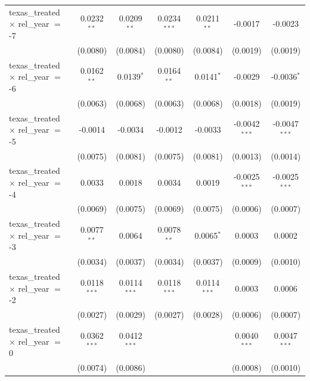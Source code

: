 \begin{tabular}{lcccccc}
   texas\_treated $\times$ rel\_year $=$ -7     & 0.0232$^{**}$  & 0.0209$^{**}$  & 0.0234$^{***}$ & 0.0211$^{**}$  & -0.0017         & -0.0023\\   
                                                & (0.0080)       & (0.0084)       & (0.0080)       & (0.0084)       & (0.0019)        & (0.0019)\\   
   texas\_treated $\times$ rel\_year $=$ -6     & 0.0162$^{**}$  & 0.0139$^{*}$   & 0.0164$^{**}$  & 0.0141$^{*}$   & -0.0029         & -0.0036$^{*}$\\   
                                                & (0.0063)       & (0.0068)       & (0.0063)       & (0.0068)       & (0.0018)        & (0.0019)\\   
   texas\_treated $\times$ rel\_year $=$ -5     & -0.0014        & -0.0034        & -0.0012        & -0.0033        & -0.0042$^{***}$ & -0.0047$^{***}$\\   
                                                & (0.0075)       & (0.0081)       & (0.0075)       & (0.0081)       & (0.0013)        & (0.0014)\\   
   texas\_treated $\times$ rel\_year $=$ -4     & 0.0033         & 0.0018         & 0.0034         & 0.0019         & -0.0025$^{***}$ & -0.0025$^{***}$\\   
                                                & (0.0069)       & (0.0075)       & (0.0069)       & (0.0075)       & (0.0006)        & (0.0007)\\   
   texas\_treated $\times$ rel\_year $=$ -3     & 0.0077$^{**}$  & 0.0064         & 0.0078$^{**}$  & 0.0065$^{*}$   & 0.0003          & 0.0002\\   
                                                & (0.0034)       & (0.0037)       & (0.0034)       & (0.0037)       & (0.0009)        & (0.0010)\\   
   texas\_treated $\times$ rel\_year $=$ -2     & 0.0118$^{***}$ & 0.0114$^{***}$ & 0.0118$^{***}$ & 0.0114$^{***}$ & 0.0003          & 0.0006\\   
                                                & (0.0027)       & (0.0029)       & (0.0027)       & (0.0028)       & (0.0006)        & (0.0007)\\   
   texas\_treated $\times$ rel\_year $=$ 0      & 0.0362$^{***}$ & 0.0412$^{***}$ &                &                & 0.0040$^{***}$  & 0.0047$^{***}$\\   
                                                & (0.0074)       & (0.0086)       &                &                & (0.0008)        & (0.0010)\\   

\end{tabular}
